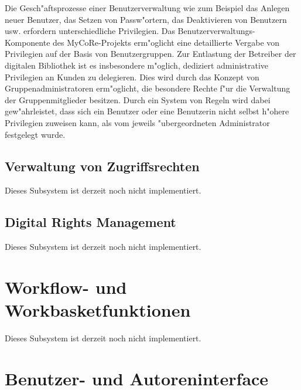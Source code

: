 Die Gesch"aftsprozesse einer Benutzerverwaltung wie zum Beispiel das Anlegen neuer 
Benutzer, das Setzen von Passw"ortern, das Deaktivieren von Benutzern usw. erfordern 
unterschiedliche Privilegien. 
Das Benutzerverwaltungs-Komponente des MyCoRe-Projekts erm"oglicht eine detaillierte 
Vergabe von Privilegien auf der Basis von Benutzergruppen. 
Zur Entlastung der Betreiber der digitalen Bibliothek ist es insbesondere m"oglich, 
dediziert administrative Privilegien an Kunden zu delegieren. 
Dies wird durch das Konzept von Gruppenadministratoren erm"oglicht, die besondere
Rechte f"ur die Verwaltung der Gruppenmitglieder besitzen.
Durch ein System von Regeln wird dabei gew"ahrleistet, dass sich ein Benutzer oder 
eine Benutzerin nicht selbst h"ohere Privilegien zuweisen kann, als vom jeweils 
"ubergeordneten Administrator festgelegt wurde.

\subsection{Verwaltung von Zugriffsrechten}
Dieses Subsystem ist derzeit noch nicht implementiert.

\subsection{Digital Rights Management}
Dieses Subsystem ist derzeit noch nicht implementiert.

\section{Workflow- und Workbasketfunktionen}
Dieses Subsystem ist derzeit noch nicht implementiert.

\section{Benutzer- und Autoreninterface}



 